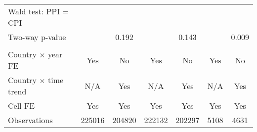{\begin{tabular}{l*{6}{c}}
Wald test: PPI = CPI&                     &                     &                     &                     &                     &                     \\
\hspace{15pt} Two-way p-value&                     &       0.192         &                     &       0.143         &                     &       0.009         \\
\hline \\ Country $\times$ year FE&         Yes         &          No         &         Yes         &          No         &         Yes         &          No         \\
Country $\times$ time trend&         N/A         &         Yes         &         N/A         &         Yes         &         N/A         &         Yes         \\
Cell FE             &         Yes         &         Yes         &         Yes         &         Yes         &         Yes         &         Yes         \\
Observations        &      225016         &      204820         &      222132         &      202297         &        5108         &        4631         \\
\hline\hline
\end{tabular}
}
